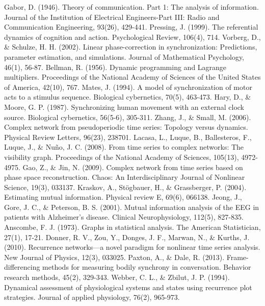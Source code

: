 \documentclass[12pt]{article}
\begin{document}
\begin{thebibliography}{}
    Gabor, D. (1946). Theory of communication. Part 1: The analysis of information. Journal of the Institution of Electrical Engineers-Part III: Radio and Communication Engineering, 93(26), 429-441.
    Pressing, J. (1999). The referential dynamics of cognition and action. Psychological Review, 106(4), 714.
    Vorberg, D., \& Schulze, H. H. (2002). Linear phase-correction in synchronization: Predictions, parameter estimation, and simulations. Journal of Mathematical Psychology, 46(1), 56-87.
    Bellman, R. (1956). Dynamic programming and Lagrange multipliers. Proceedings of the National Academy of Sciences of the United States of America, 42(10), 767.
    Mates, J. (1994). A model of synchronization of motor acts to a stimulus sequence. Biological cybernetics, 70(5), 463-473.
    Hary, D., \& Moore, G. P. (1987). Synchronizing human movement with an external clock source. Biological cybernetics, 56(5-6), 305-311.
    Zhang, J., \& Small, M. (2006). Complex network from pseudoperiodic time series: Topology versus dynamics. Physical Review Letters, 96(23), 238701.
    Lacasa, L., Luque, B., Ballesteros, F., Luque, J., \& Nuño, J. C. (2008). From time series to complex networks: The visibility graph. Proceedings of the National Academy of Sciences, 105(13), 4972-4975.
    Gao, Z., \& Jin, N. (2009). Complex network from time series based on phase space reconstruction. Chaos: An Interdisciplinary Journal of Nonlinear Science, 19(3), 033137.
    Kraskov, A., Stögbauer, H., \& Grassberger, P. (2004). Estimating mutual information. Physical review E, 69(6), 066138.
    Jeong, J., Gore, J. C., \& Peterson, B. S. (2001). Mutual information analysis of the EEG in patients with Alzheimer's disease. Clinical Neurophysiology, 112(5), 827-835.
    Anscombe, F. J. (1973). Graphs in statistical analysis. The American Statistician, 27(1), 17-21.
    Donner, R. V., Zou, Y., Donges, J. F., Marwan, N., \& Kurths, J. (2010). Recurrence networks—a novel paradigm for nonlinear time series analysis. New Journal of Physics, 12(3), 033025.
    Paxton, A., \& Dale, R. (2013). Frame-differencing methods for measuring bodily synchrony in conversation. Behavior research methods, 45(2), 329-343.
    Webber, C. L., \& Zbilut, J. P. (1994). Dynamical assessment of physiological systems and states using recurrence plot strategies. Journal of applied physiology, 76(2), 965-973.

\end{thebibliography}
\end{document}
